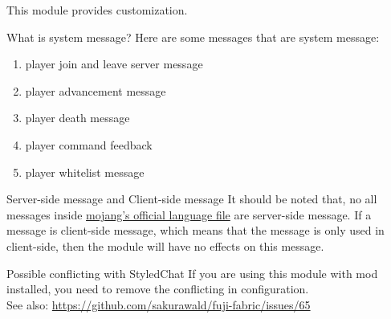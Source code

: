 
This module provides  customization.

\begin{note}{What is system message?}
    Here are some messages that are system message:
    \begin{enumerate}
        \item player join and leave server message
        \item player advancement message
        \item player death message
        \item player command feedback
        \item player whitelist message
    \end{enumerate}
\end{note}

\begin{note}{Server-side message and Client-side message}
    It should be noted that, no all messages inside \href{https://github.com/sakurawald/fuji-fabric/blob/dev/.github/files/en_us.json}{mojang's official language file} are server-side message.
    If a message is client-side message, which means that the message is only used in client-side, then the module will have no effects on this message.
\end{note}

\begin{warn}{Possible conflicting with StyledChat}
    If you are using this module with  mod installed, you need to remove the conflicting  in  configuration. \\
    See also: \url{https://github.com/sakurawald/fuji-fabric/issues/65}
\end{warn}